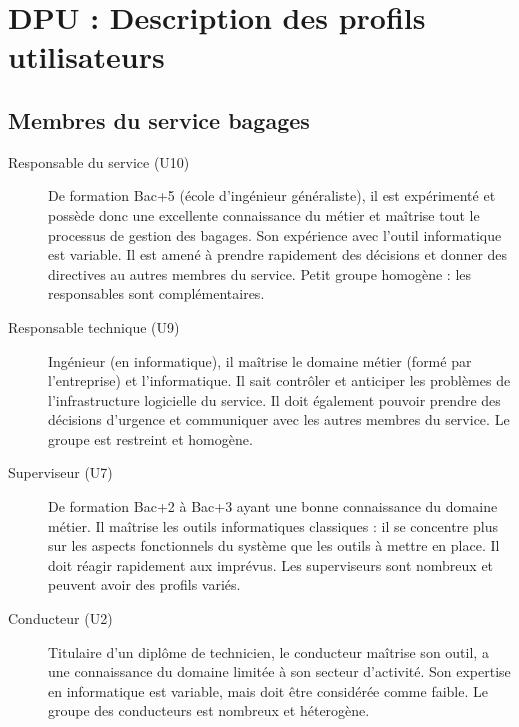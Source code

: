 \documentclass{article}
\begin{document}
\section{DPU : Description des profils utilisateurs}

\subsection{Membres du service bagages}
\begin{description}
\item[Responsable du service (U10)] De formation Bac+5 (école d'ingénieur
généraliste), il est expérimenté et possède donc une excellente connaissance du
métier et maîtrise tout le processus de gestion des bagages. Son expérience avec
l'outil informatique est variable. Il est amené à prendre rapidement des
décisions et donner des directives au autres membres du service. Petit groupe
homogène : les responsables sont complémentaires.
\item[Responsable technique (U9)] Ingénieur (en informatique), il maîtrise le
domaine métier (formé par l'entreprise) et l'informatique. Il sait contrôler et
anticiper les problèmes de l'infrastructure logicielle du service. Il doit
également pouvoir prendre des décisions d'urgence et communiquer avec les autres
membres du service. Le groupe est restreint et homogène.
\item[Superviseur (U7)] De formation Bac+2 à Bac+3 ayant une bonne connaissance
du domaine métier. Il maîtrise les outils informatiques classiques : il se concentre plus
sur les aspects fonctionnels du système que les outils à mettre en place. Il
doit réagir rapidement aux imprévus. Les superviseurs sont nombreux et peuvent
avoir des profils variés.
\item[Conducteur (U2)] Titulaire d'un diplôme de technicien, le conducteur
maîtrise son outil, a une connaissance du domaine limitée à son secteur d'activité. Son
expertise en informatique est variable, mais doit être considérée comme faible.
Le groupe des conducteurs est nombreux et héterogène.
\end{description}
\end{document}
